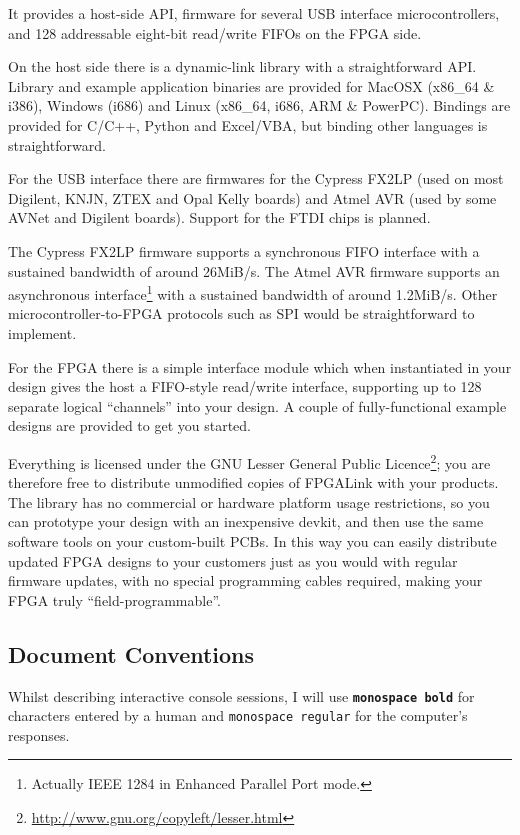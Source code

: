 It provides a host-side API, firmware for several USB interface microcontrollers, and 128 addressable eight-bit read/write FIFOs on the FPGA side.

\begin{blobs}
  \item
    On the host side there is a dynamic-link library with a straightforward API. Library and example application binaries are provided for MacOSX (x86\_64 \& i386), Windows (i686) and Linux (x86\_64, i686, ARM \& PowerPC). Bindings are provided for C/C++, Python and Excel/VBA, but binding other languages is straightforward.
  \item
    For the USB interface there are firmwares for the Cypress FX2LP (used on most Digilent, KNJN, ZTEX and Opal Kelly boards) and Atmel AVR (used by some AVNet and Digilent boards). Support for the FTDI chips is planned.
  \item
    The Cypress FX2LP firmware supports a synchronous FIFO interface with a sustained bandwidth of around 26MiB/s. The Atmel AVR firmware supports an asynchronous interface\footnote{Actually IEEE 1284 in Enhanced Parallel Port mode.} with a sustained bandwidth of around 1.2MiB/s. Other microcontroller-to-FPGA protocols such as SPI would be straightforward to implement.
  \item
    For the FPGA there is a simple interface module which when instantiated in your design gives the host a FIFO-style read/write interface, supporting up to 128 separate logical ``channels'' into your design. A couple of fully-functional example designs are provided to get you started.
\end{blobs}

Everything is licensed under the GNU Lesser General Public Licence\footnote{\url{http://www.gnu.org/copyleft/lesser.html}}; you are therefore free to distribute unmodified copies of FPGALink with your products. The library has no commercial or hardware platform usage restrictions, so you can prototype your design with an inexpensive devkit, and then use the same software tools on your custom-built PCBs. In this way you can easily distribute updated FPGA designs to your customers just as you would with regular firmware updates, with no special programming cables required, making your FPGA truly ``field-programmable''.

\subsection{Document Conventions}
Whilst describing interactive console sessions, I will use {\bf\textcolor[rgb]{0.00,0.00,0.00}{\texttt{monospace bold}}} for characters entered by a human and {\textcolor[rgb]{0.20,0.20,0.20}{\texttt{monospace regular}}} for the computer's responses.

